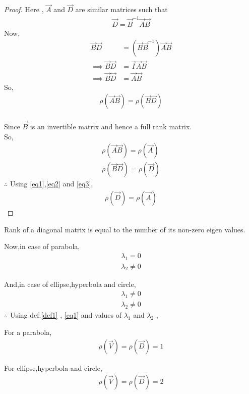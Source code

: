 \documentclass[journal,12pt,twocolumn]{IEEEtran}
\begin{document}
\begin{proof}
Here , $\vec{A}$ and $\vec{D}$ are similar matrices such that 
\begin{align}
    \vec{D} = \vec{B}^{-1}\vec{A}\vec{B}
\end{align}
Now,
\begin{align}
    \vec{B}\vec{D} &= (\vec{B}\vec{B}^{-1})\vec{A}\vec{B}
    \\
    \implies \vec{B}\vec{D} &= \vec{I}\vec{A}\vec{B}
    \\
    \implies \vec{B}\vec{D} &= \vec{A}\vec{B}
\end{align}
So,
\begin{align}
    \rho(\vec{A}\vec{B}) = \rho(\vec{B}\vec{D}) \label{eq1}
\end{align}
\\
Since $\vec{B}$ is an invertible matrix and hence a full rank matrix.
\\
So,
\begin{align}
    \rho(\vec{A}\vec{B}) = \rho(\vec{A}) \label{eq2}
    \\
    \rho(\vec{B}\vec{D}) = \rho(\vec{D}) \label{eq3}
\end{align}
$\therefore$ Using \eqref{eq1},\eqref{eq2} and \eqref{eq3},
\begin{align}
    \rho(\vec{D}) = \rho(\vec{A})
\end{align}
\end{proof}

\begin{definition}
Rank of a diagonal matrix is equal to the number of its non-zero eigen values. \label{def1}
\end{definition}

Now,in case of parabola, 
\begin{align}
    \lambda_1 =0 
    \\
    \lambda_2 \neq 0 
\end{align}

And,in case of ellipse,hyperbola and circle, \label{result2}
\begin{align}
    \lambda_1 \neq 0 
    \\
    \lambda_2 \neq 0 
\end{align}
$\therefore$
Using def.\ref{def1} , \eqref{eq1} and values of $\lambda_1$ and $\lambda_2$ ,

For a parabola,
\begin{align}
    \rho(\vec{V}) = \rho(\vec{D}) = 1
\end{align}

For ellipse,hyperbola and circle,
\begin{align}
    \rho(\vec{V}) = \rho(\vec{D}) = 2
\end{align}
\end{document}
